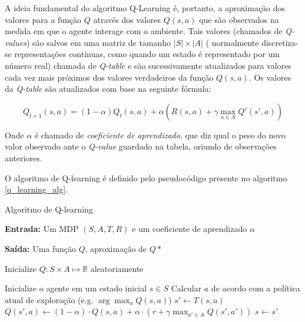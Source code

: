 \documentclass[cic,tc]{iiufrgs}
\begin{document}
A ideia fundamental do algoritmo Q-Learning é, portanto, a aproximação dos
valores para a função $Q$ através dos valores $Q(s, a)$ que são observados na
medida em que o agente interage com o ambiente. Tais valores (chamados de
\textit{Q-values}) são salvos em uma matriz de tamanho $|S| \times |A|$ (
normalmente discretiza-se representações contínuas, como quando um estado é
representado por um número real) chamada de \textit{Q-table} e são
sucessivamente atualizados para valores cada vez mais próximos dos valores
verdadeiros da função $Q(s, a)$. Os valores da \textit{Q-table} são atualizados
com base na seguinte fórmula:

\begin{equation}
  \label{q_learning_update}
  Q_{t+1}(s, a) = (1 - \alpha)Q_t(s, a) + \alpha(R(s, a) + \gamma\max_{a \in A}Q'(s', a))
\end{equation}

Onde $\alpha$ é chamado de \textit{coeficiente de aprendizado}, que diz qual o
peso do novo valor observado ante o \textit{Q-value} guardado na tabela, oriundo
de observações anteriores.

O algoritmo de Q-learning é definido pelo pseudocódigo presente no algoritmo
\ref{q_learning_alg}.


\begin{algorithm}
  \label{q_learning_alg}
\caption{Algoritmo de Q-learning}

\textbf{Entrada:}  Um MDP $(S, A, T, R)$ e um coeficiente de aprendizado $\alpha$


\textbf{Saída:} Uma função $Q$, aproximação de $Q*$


\begin{algorithmic}[1]
  \State Inicialize $Q: S \times A\mapsto \mathbb{R} $ aleatoriamente

  \Repeat
    \State Inicialize o agente em um estado inicial $s \in S$
      \State Calcular $a$ de acordo com a política atual de exploração (e.g. $\arg \max_a Q(s,a)$)
      \State $s' \gets T(s, a)$
      \State $Q(s', a) \gets (1 - \alpha)\cdot Q(s,a) + \alpha \cdot (r + \gamma\max_{a' \in A}Q(s', a'))$
      \State $s \gets s'$
    \EndWhile
\EndFunction
\end{algorithmic}
\end{algorithm}
\end{document}
